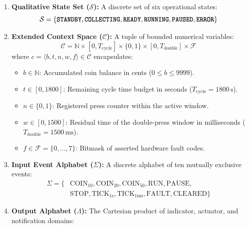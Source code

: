 \begin{enumerate}[leftmargin=*]
  \item \textbf{Qualitative State Set ($\mathcal{S}$):} A discrete set of six operational states:
        \begin{equation}
          \mathcal{S} = \{\text{\texttt{\textbf{STANDBY}}}, \text{\texttt{\textbf{COLLECTING}}}, \text{\texttt{\textbf{READY}}}, \text{\texttt{\textbf{RUNNING}}}, \text{\texttt{\textbf{PAUSED}}}, \text{\texttt{\textbf{ERROR}}}\}
        \end{equation}
  \item \textbf{Extended Context Space ($\mathcal{C}$):} A tuple of bounded numerical variables:
        \begin{equation}
          \mathcal{C} = \mathbb{N} \times [0, T_{\text{cycle}}] \times \{0, 1\} \times [0, T_{\text{double}}] \times \mathcal{F}
        \end{equation}
        where $c = \langle b, t, n, w, f \rangle \in \mathcal{C}$ encapsulates:
        \begin{itemize}
          \item $b \in \mathbb{N}$: Accumulated coin balance in cents ($0 \le b \le 9999$).
          \item $t \in [0, 1800]$: Remaining cycle time budget in seconds ($T_{\text{cycle}} = 1800\,\text{s}$).
          \item $n \in \{0, 1\}$: Registered  press counter within the active window.
          \item $w \in [0, 1500]$: Residual time of the double-press window in milliseconds ($T_{\text{double}} = 1500\,\text{ms}$).
          \item $f \in \mathcal{F} = \{0, \dots, 7\}$: Bitmask of asserted hardware fault codes.
        \end{itemize}
  \item \textbf{Input Event Alphabet ($\Sigma$):} A discrete alphabet of ten mutually exclusive events:
        \begin{equation}
        \begin{aligned}
          \Sigma = \big\{ & \text{COIN}_{10}, \text{COIN}_{20}, \text{COIN}_{50}, \text{RUN}, \text{PAUSE}, \\
                          & \text{STOP}, \text{TICK}_{1\text{s}}, \text{TICK}_{1\text{ms}}, \text{FAULT}, \text{CLEARED} \big\}
        \end{aligned}
        \end{equation}
  \item \textbf{Output Alphabet ($\Lambda$):} The Cartesian product of indicator, actuator, and notification domains:

\end{enumerate}
